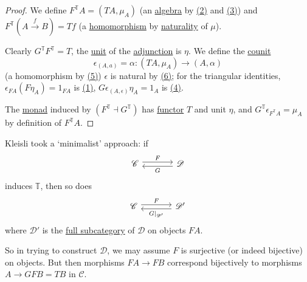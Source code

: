 \documentclass{article}
\begin{document}
\begin{proof}
  We define $F^\mathbb{T} A = (TA, \mu_A)$ (an \hyperlink{def:em}{algebra} by \hyperlink{eq:monad2}{(2)} and \hyperlink{eq:monad3}{(3)}) and $F^\mathbb{T}(A \xrightarrow{f} B) = Tf$ (a \hyperlink{def:em}{homomorphism} by \hyperlink{def:nattrans}{naturality} of $\mu$).

  Clearly $G^\mathbb{T} F^\mathbb{T} = T$, the \hyperlink{def:unit}{unit} of the \hyperlink{def:adj}{adjunction} is $\eta$.
  We define the \hyperlink{def:counit}{counit}
  \begin{equation*}\epsilon_{(A,a)} = \alpha: (TA, \mu_A) \to (A, \alpha)\end{equation*}
  (a homomorphism by \hyperlink{eq:em5}{(5)})
  $\epsilon$ is natural by \hyperlink{eq:em6}{(6)}; for the triangular identities, $\epsilon_{FA} (F \eta_A) = 1_{FA}$ is \hyperlink{eq:monad1}{(1)}, $G \epsilon_{(A,\epsilon)} \eta_A = 1_A$ is \hyperlink{eq:em4}{(4)}.

  The \hyperlink{def:monad}{monad} induced by $(F^\mathbb{T} \dashv G^\mathbb{T})$ has \hyperlink{def:funct}{functor} $T$ and unit $\eta$, and $G^\mathbb{T} \epsilon_{F^\mathbb{T} A} = \mu_A$ by definition of $F^\mathbb{T} A$.
\end{proof}

Kleisli took a `minimalist' approach: if
\begin{equation*}
  \begin{tikzcd}[column sep=large]
    \mathscr{C} \rar[shift left]{F} & \mathscr{D} \lar[shift left]{G}
  \end{tikzcd}
\end{equation*}
induces $\mathbb{T}$, then so does
\begin{equation*}
  \begin{tikzcd}[column sep=large]
    \mathscr{C} \rar[shift left]{F} & \mathscr{D}' \lar[shift left]{G|_{\mathscr{D}'}}
  \end{tikzcd}
\end{equation*}
where $\mathscr{D}'$ is the \hyperlink{def:fulls}{full subcategory} of $\mathscr{D}$ on objects $FA$.

So in trying to construct $\mathscr{D}$, we may assume $F$ is surjective (or indeed bijective) on objects.
But then morphisms $FA \to FB$ correspond bijectively to morphisms $A \to GFB = TB$ in $\mathscr{C}$.
\end{document}
